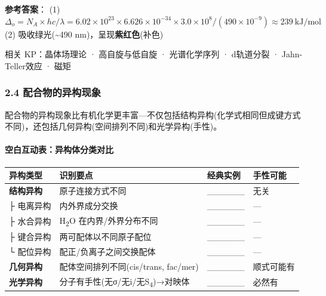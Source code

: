 \textbf{参考答案}：
(1) \(\Delta_o = N_A \times hc / \lambda = 6.02\times10^{23} \times 6.626\times10^{-34} \times 3.0\times10^8 / (490\times10^{-9}) \approx 239\ \mathrm{kJ/mol}\)
(2) 吸收绿光(\textasciitilde490 nm)，呈现\textbf{紫红色}(补色)

相关 KP：晶体场理论 · 高自旋与低自旋 · 光谱化学序列 · d轨道分裂 · Jahn-Teller效应 · 磁矩

\subsubsection{2.4 配合物的异构现象}\label{ux914dux5408ux7269ux7684ux5f02ux6784ux73b0ux8c61}

配合物的异构现象比有机化学更丰富---不仅包括结构异构(化学式相同但成键方式不同)，还包括几何异构(空间排列不同)和光学异构(手性)。

\paragraph{空白互动表：异构体分类对比}\label{ux7a7aux767dux4e92ux52a8ux8868ux5f02ux6784ux4f53ux5206ux7c7bux5bf9ux6bd4}

{\def\LTcaptype{none} %
\begin{longtable}[]{@{}
  >{\centering\arraybackslash}p{}
  >{\raggedright\arraybackslash}p{}
  >{\raggedright\arraybackslash}p{}
  >{\centering\arraybackslash}p{}@{}}
\toprule\noalign{}
\begin{minipage}[b]{\linewidth}\centering
异构类型
\end{minipage} & \begin{minipage}[b]{\linewidth}\raggedright
识别要点
\end{minipage} & \begin{minipage}[b]{\linewidth}\raggedright
经典实例
\end{minipage} & \begin{minipage}[b]{\linewidth}\centering
手性可能
\end{minipage} \\
\midrule\noalign{}
\endhead
\bottomrule\noalign{}
\endlastfoot
\textbf{结构异构} & 原子连接方式不同 & \_\_\_\_\_\_ & 无关 \\
├ 电离异构 & 内外界成分交换 & \_\_\_\_\_\_ & --- \\
├ 水合异构 & H\textsubscript{2}O 在内界/外界分布不同 & \_\_\_\_\_\_ & --- \\
├ 键合异构 & 两可配体以不同原子配位 & \_\_\_\_\_\_ & --- \\
└ 配位异构 & 配正/负离子之间交换配体 & \_\_\_\_\_\_ & --- \\
\textbf{几何异构} & 配体空间排列不同(cis/trans, fac/mer) & \_\_\_\_\_\_ & 顺式可能有 \\
\textbf{光学异构} & 分子有手性(无σ/无i/无S\textsubscript{4})→对映体 & \_\_\_\_\_\_ & 必然有 \\
\end{longtable}
}

